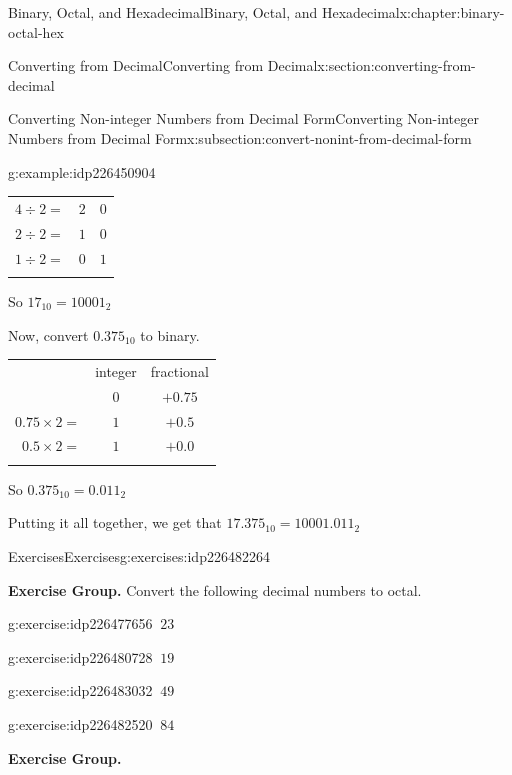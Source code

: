 \documentclass[twoside,10pt,]{book}
\newcommand{\tabularfont}{\relax}
\numberwithin{equation}{section}
\newcommand{\hrulemedium}{\noalign{\hrule height 0.07em}}
\newcommand{\hrulethick} {\noalign{\hrule height 0.11em}}
\begin{document}
\begin{chapterptx}{Binary, Octal, and Hexadecimal}{}{Binary, Octal, and Hexadecimal}{}{}{x:chapter:binary-octal-hex}
\begin{sectionptx}{Converting from Decimal}{}{Converting from Decimal}{}{}{x:section:converting-from-decimal}
\begin{subsectionptx}{Converting Non-integer Numbers from Decimal Form}{}{Converting Non-integer Numbers from Decimal Form}{}{}{x:subsection:convert-nonint-from-decimal-form}
\begin{example}{}{g:example:idp226450904}
\begin{center}
{\begin{tabular}{ccc}
\multicolumn{1}{r}{\(4\div 2=\)}&\(2\)&\(0\)\tabularnewline[0pt]
\multicolumn{1}{r}{\(2\div 2 = \)}&\(1\)&\(0\)\tabularnewline[0pt]
\multicolumn{1}{r}{\(1\div 2=\)}&\(0\)&\(1\)\tabularnewline\hrulethick
\end{tabular}
}%
\end{center}%
 So \(17_{10}=10001_2\)%
\par
Now, convert \(0.375_{10}\) to binary. \begin{center}%
{\tabularfont%
\begin{tabular}{ccc}\hrulethick
&integer&fractional\tabularnewline\hrulemedium
\multicolumn{1}{r}{\(0.375\times 2=\)}&\(0\)&\(+0.75\)\tabularnewline[0pt]
\multicolumn{1}{r}{\(0.75\times 2=\)}&\(1\)&\(+0.5\)\tabularnewline[0pt]
\multicolumn{1}{r}{\(0.5\times 2=\)}&\(1\)&\(+0.0\)\tabularnewline\hrulethick
\end{tabular}
}%
\end{center}%
 So \(0.375_{10}=0.011_2\)%
\par
Putting it all together, we get that \(17.375_{10}=10001.011_2\)%
\end{example}
\end{subsectionptx}
%
%
\typeout{************************************************}
\typeout{************************************************}
%
\begin{exercises-subsection}{Exercises}{}{Exercises}{}{}{g:exercises:idp226482264}
\par\medskip\noindent%
\textbf{Exercise Group.}\space\space%
Convert the following decimal numbers to octal.\begin{exercisegroup}
\begin{divisionexerciseeg}{1}{}{}{g:exercise:idp226477656}%
\(\ 23\)\end{divisionexerciseeg}%
\begin{divisionexerciseeg}{2}{}{}{g:exercise:idp226480728}%
\(\ 19\)\end{divisionexerciseeg}%
\begin{divisionexerciseeg}{3}{}{}{g:exercise:idp226483032}%
\(\ 49\)\end{divisionexerciseeg}%
\begin{divisionexerciseeg}{4}{}{}{g:exercise:idp226482520}%
\(\ 84\)\end{divisionexerciseeg}%
\end{exercisegroup}
\par\medskip\noindent
\par\medskip\noindent%
\textbf{Exercise Group.}\space\space%

\end{exercises-subsection}
\end{sectionptx}
\end{chapterptx}
\end{document}
